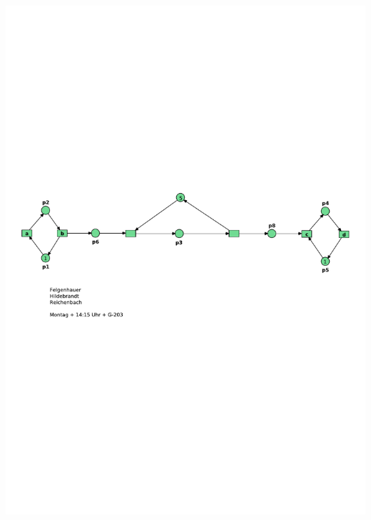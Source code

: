 \documentclass[12pt,a4paper]{../krautsourcing/homework}
\begin{document}
\subsection{}
\includegraphics[scale=0.8,trim={5mm 140mm 5mm 100mm},clip]{Aufgabe_6-4/Aufgabe_6-4-4.pdf}
\end{document}
